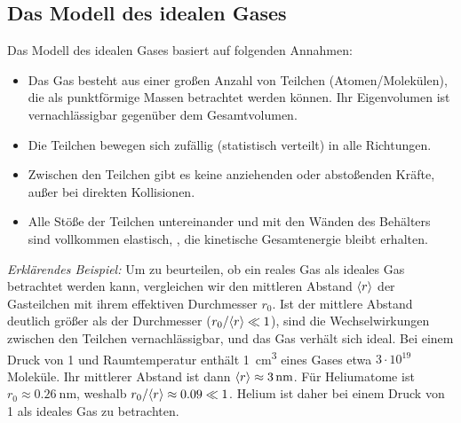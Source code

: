 \subsection{Das Modell des idealen Gases}\label{subsec: modell_ideales_gas}
Das Modell des idealen Gases basiert auf folgenden Annahmen:
\begin{itemize}
    \item Das Gas besteht aus einer großen Anzahl von Teilchen (Atomen/Molekülen), die als punktförmige Massen betrachtet werden können. Ihr Eigenvolumen ist vernachlässigbar gegenüber dem Gesamtvolumen.
    \item Die Teilchen bewegen sich zufällig (statistisch verteilt) in alle Richtungen.
    \item Zwischen den Teilchen gibt es keine anziehenden oder abstoßenden Kräfte, außer bei direkten Kollisionen.
    \item Alle Stöße der Teilchen untereinander und mit den Wänden des Behälters sind vollkommen elastisch, \gDh, die kinetische Gesamtenergie bleibt erhalten.
\end{itemize}
\textit{Erklärendes Beispiel:} Um zu beurteilen, ob ein reales Gas als ideales Gas betrachtet werden kann, vergleichen wir den mittleren Abstand ${\langle{r}\rangle}$ der Gasteilchen mit ihrem effektiven Durchmesser $r_0$. Ist der mittlere Abstand deutlich größer als der Durchmesser ($r_0/{\langle{r}\rangle} \ll 1$), sind die Wechselwirkungen zwischen den Teilchen vernachlässigbar, und das Gas verhält sich ideal.
Bei einem Druck von \SI{1}{\barPr} und Raumtemperatur enthält \SI{1}{\centi\meter\cubed} eines Gases etwa $3\cdot 10^{19}$ Moleküle. Ihr mittlerer Abstand ist dann ${\langle{r}\rangle} \approx \SI{3}{\nano\meter}$. Für Heliumatome ist $r_0 \approx \SI{0.26}{\nano\meter}$, weshalb $r_0/{\langle{r}\rangle} \approx \num{0.09} \ll 1$. Helium ist daher bei einem Druck von \SI{1}{\barPr} als ideales Gas zu betrachten.

